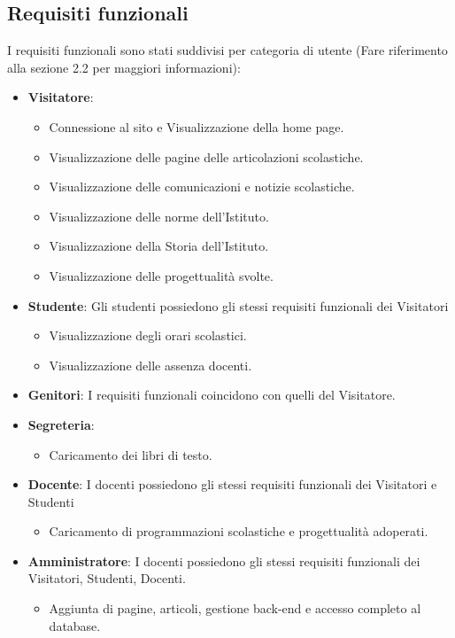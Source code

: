 \documentclass{article}
\begin{document}
\subsection{\textbf{Requisiti funzionali}}
\normalsize
\flushleft
I requisiti funzionali sono stati suddivisi per categoria di utente (Fare riferimento alla sezione 2.2 per maggiori informazioni):
\begin{itemize}
	\item \textbf{Visitatore}:
	\begin{itemize}
		\item Connessione al sito e Visualizzazione della home page.
		\item Visualizzazione delle pagine delle articolazioni scolastiche.
		\item Visualizzazione delle comunicazioni e notizie scolastiche.
		\item Visualizzazione delle norme dell'Istituto.
		\item Visualizzazione della Storia dell'Istituto.
		\item Visualizzazione delle progettualità svolte.	
	\end{itemize}
	\item \textbf{Studente}: Gli studenti possiedono gli stessi requisiti funzionali dei Visitatori
	\begin{itemize}
		\item Visualizzazione degli orari scolastici.
		\item Visualizzazione delle assenza docenti.	
	\end{itemize}		
	\item \textbf{Genitori}: I requisiti funzionali coincidono con quelli del Visitatore.
	\item \textbf{Segreteria}:
		\begin{itemize}
			\item Caricamento dei libri di testo.	
	\end{itemize}
	\item \textbf{Docente}: I docenti possiedono gli stessi requisiti funzionali dei Visitatori e Studenti
	\begin{itemize}
		\item Caricamento di programmazioni scolastiche e progettualità adoperati.	
	\end{itemize}
	\item \textbf{Amministratore}: I docenti possiedono gli stessi requisiti funzionali dei Visitatori, Studenti, Docenti.
	\begin{itemize}
		\item Aggiunta di pagine, articoli, gestione back-end e accesso completo al database.

\end{itemize}
\end{itemize}
\end{document}
